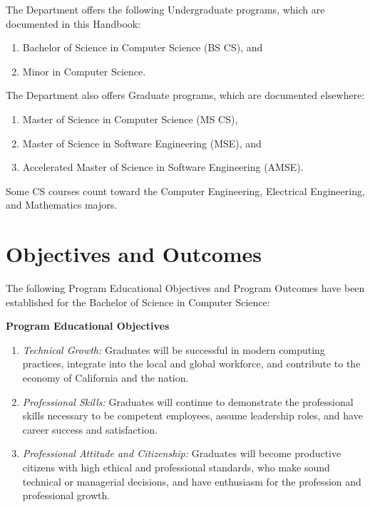 \documentclass{book}
\begin{document}
The Department offers the following Undergraduate programs, which are documented in this Handbook:
\begin{enumerate}
\item Bachelor of Science in Computer Science (BS CS), and
\item Minor in Computer Science.
\end{enumerate}

The Department also offers Graduate programs, which are documented elsewhere:
\begin{enumerate}
\item Master of Science in Computer Science (MS CS),
\item Master of Science in Software Engineering (MSE), and
\item Accelerated Master of Science in Software Engineering (AMSE).
\end{enumerate}

Some CS courses count toward the Computer Engineering, Electrical Engineering, and Mathematics majors.

\section{Objectives and Outcomes}

The following Program Educational Objectives and Program Outcomes have been established for the Bachelor of Science in Computer Science:

\textbf{Program Educational Objectives} 
\begin{enumerate}
\item \emph{Technical Growth:}  Graduates will be successful in modern computing practices, integrate into the local and global workforce, and contribute to the economy of California and the nation.
\item \emph{Professional Skills:} Graduates will continue to demonstrate the professional skills necessary to be competent employees, assume leadership roles, and have career success and satisfaction.
\item \emph{Professional Attitude and Citizenship:} Graduates will become productive citizens with high ethical and professional standards, who make sound technical or managerial decisions, and have enthusiasm for the profession and professional growth.
\end{enumerate}
\end{document}
